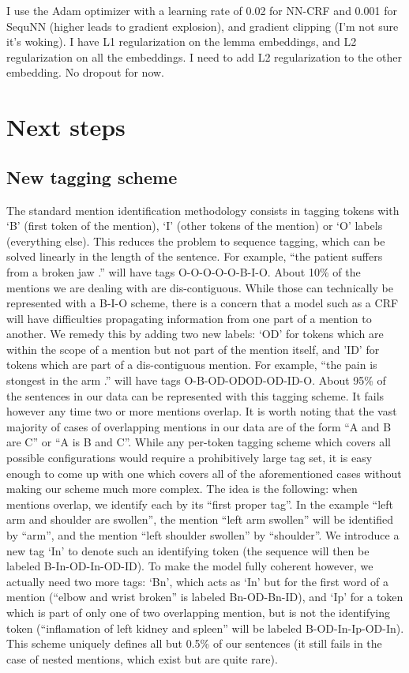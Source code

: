 \documentclass[10pt,a4paper]{article}
\begin{document}
I use the Adam optimizer with a learning rate of 0.02 for NN-CRF and 0.001 for SequNN (higher leads to gradient explosion), and gradient clipping (I'm not sure it's woking). I have L1 regularization on the lemma embeddings, and L2 regularization on all the embeddings. I need to add L2 regularization to the other embedding. No dropout for now.

\section{Next steps}

\subsection{New tagging scheme}

The standard mention identification methodology consists in tagging tokens
with ‘B’ (first token of the mention), ‘I’ (other tokens of the mention) or ‘O’
labels (everything else). This reduces the problem to sequence tagging, which
can be solved linearly in the length of the sentence. For example, “the patient
suffers from a broken jaw .” will have tags O-O-O-O-O-B-I-O.
About 10\% of the mentions we are dealing with are dis-contiguous. While
those can technically be represented with a B-I-O scheme, there is a concern
that a model such as a CRF will have difficulties propagating information from
one part of a mention to another. We remedy this by adding two new labels:
‘OD’ for tokens which are within the scope of a mention but not part of the
mention itself, and ’ID’ for tokens which are part of a dis-contiguous mention.
For example, “the pain is stongest in the arm .” will have tags O-B-OD-ODOD-OD-ID-O.
About 95\% of the sentences in our data can be represented with this tagging
scheme. It fails however any time two or more mentions overlap.
It is worth noting that the vast majority of cases of overlapping mentions
in our data are of the form “A and B are C” or “A is B and C”. While any
per-token tagging scheme which covers all possible configurations would require
a prohibitively large tag set, it is easy enough to come up with one which covers
all of the aforementioned cases without making our scheme much more complex.
The idea is the following: when mentions overlap, we identify each by its
“first proper tag”. In the example “left arm and shoulder are swollen”, the
mention “left arm swollen” will be identified by “arm”, and the mention “left
shoulder swollen” by “shoulder”. We introduce a new tag ‘In’ to denote such
an identifying token (the sequence will then be labeled B-In-OD-In-OD-ID).
To make the model fully coherent however, we actually need two more tags:
‘Bn’, which acts as ‘In’ but for the first word of a mention (“elbow and wrist
broken” is labeled Bn-OD-Bn-ID), and ‘Ip’ for a token which is part of only one
of two overlapping mention, but is not the identifying token (“inflamation of
left kidney and spleen” will be labeled B-OD-In-Ip-OD-In).
This scheme uniquely defines all but 0.5\% of our sentences (it still fails in
the case of nested mentions, which exist but are quite rare).
\end{document}
